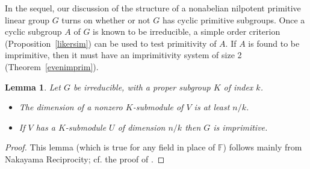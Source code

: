 \documentclass[12pt]{amsart}
\newtheorem{lemma}[theorem]{Lemma}
\theoremstyle{definition}
\theoremstyle{remark}
\begin{document}
 In the sequel, our discussion of the structure of a nonabelian 
 nilpotent primitive linear group $G$
 turns on whether or not $G$ has cyclic primitive subgroups. 
 Once a cyclic subgroup $A$ of $G$ is known to be 
 irreducible, a simple order criterion 
 (Proposition~\ref{likersim}) can be used to test
 primitivity of $A$. If $A$   
 is found to be imprimitive, then it must have 
 an imprimitivity system of size 2 
 (Theorem~\ref{evenimprim}).
\begin{lemma}
\label{nakeasy}
 Let $G$ be irreducible, with a proper subgroup $K$ 
 of index $k$. 
\begin{itemize}
\item[{\rm (i)}]  The dimension of a nonzero $K$-submodule 
  of $V$ is at least $n/k$.
 \item[{\rm (ii)}]  If $V$ has a $K$-submodule $U$ of
 dimension $n/k$ then 
 $G$ is imprimitive.
\end{itemize}
\end{lemma}
\begin{proof}
 This lemma (which is true for any field in place of $\mathbb{F}$)
 follows mainly from Nakayama Reciprocity; 
 cf. the proof of \cite[2.6]{Sim}.
\end{proof}
\end{document}
